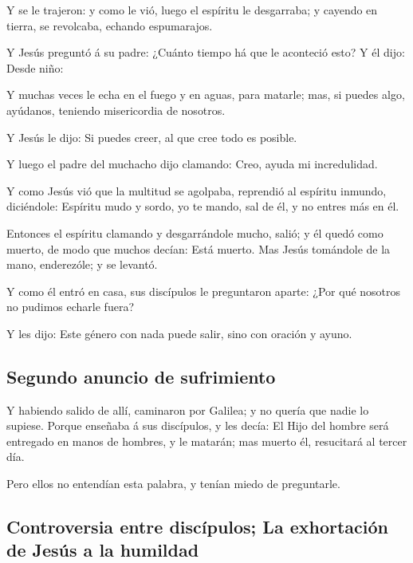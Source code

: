  Y se le trajeron: y como le vió, luego el espíritu le
desgarraba; y cayendo en tierra, se revolcaba, echando espumarajos.

 Y Jesús preguntó á su padre: ¿Cuánto tiempo há que le
aconteció esto? Y él dijo: Desde niño:

 Y muchas veces le echa en el fuego y en aguas, para
matarle; mas, si puedes algo, ayúdanos, teniendo misericordia de
nosotros.

 Y Jesús le dijo: Si puedes creer, al que cree todo es
posible.

 Y luego el padre del muchacho dijo clamando: Creo, ayuda
mi incredulidad.

 Y como Jesús vió que la multitud se agolpaba, reprendió
al espíritu inmundo, diciéndole: Espíritu mudo y sordo, yo te mando, sal
de él, y no entres más en él.

 Entonces el espíritu clamando y desgarrándole mucho,
salió; y él quedó como muerto, de modo que muchos decían: Está muerto.
 Mas Jesús tomándole de la mano, enderezóle; y se
levantó.

 Y como él entró en casa, sus discípulos le preguntaron
aparte: ¿Por qué nosotros no pudimos echarle fuera?

 Y les dijo: Este género con nada puede salir, sino con
oración y ayuno.

\hypertarget{segundo-anuncio-de-sufrimiento}{%
\subsection{Segundo anuncio de
sufrimiento}\label{segundo-anuncio-de-sufrimiento}}

 Y habiendo salido de allí, caminaron por Galilea; y no
quería que nadie lo supiese.  Porque enseñaba á sus
discípulos, y les decía: El Hijo del hombre será entregado en manos de
hombres, y le matarán; mas muerto él, resucitará al tercer día.

 Pero ellos no entendían esta palabra, y tenían miedo de
preguntarle.

\hypertarget{controversia-entre-discuxedpulos-la-exhortaciuxf3n-de-jesuxfas-a-la-humildad}{%
\subsection{Controversia entre discípulos; La exhortación de Jesús a la
humildad}\label{controversia-entre-discuxedpulos-la-exhortaciuxf3n-de-jesuxfas-a-la-humildad}}

